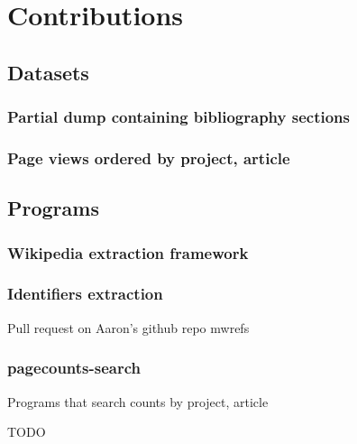 
\chapter{Contributions}
\label{cha:Contributions}

\section{Datasets}
\label{sec:Datasets}

\subsection{Partial dump containing bibliography sections}
\label{sub:contrib_datasets_bibsects}


\subsection{Page views ordered by project, article}
\label{sub:contrib_datasets_pagecounts}



\section{Programs}
\label{sec:Programs}

\subsection{Wikipedia extraction framework}
\label{sub:contrib_programs_framework}


\subsection{Identifiers extraction}
\label{sub:contrib_programs_idextract}
Pull request on Aaron's github repo mwrefs


\subsection{pagecounts-search}
\label{sub:contrib_programs_pagecountssearch}
Programs that search counts by project, article

TODO
